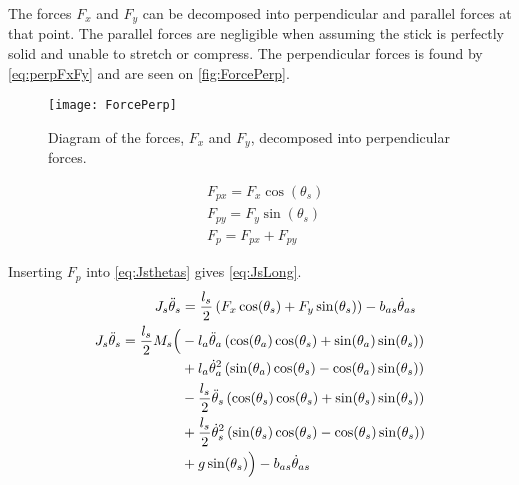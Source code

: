 The forces $F_x$ and $F_y$ can be decomposed into perpendicular and parallel forces at that point. The parallel forces are negligible when assuming the stick is perfectly solid and unable to stretch or compress. The perpendicular forces is found by \autoref{eq:perpFxFy} and are seen on \autoref{fig:ForcePerp}.

\begin{figure}[htbp]
\centering
\texttt{[image: ForcePerp]}
\caption{Diagram of the forces, $F_x$ and $F_y$, decomposed into perpendicular forces.}
\label{fig:ForcePerp}
\end{figure}

\begin{subequations}\label{eq:perpFxFy}
\begin{flalign}
& F_{px}=F_x\cos(\theta_s) \\
& F_{py}=F_y\sin(\theta_s)  \\
& F_p = F_{px}+F_{py} 
\end{flalign}
\end{subequations}

Inserting $F_p$ into \autoref{eq:Jsthetas} gives \autoref{eq:JsLong}.
\begin{subequations}
\begin{flalign}
 J_s\ddot{\theta}_s &=\frac{l_s}{2}\left(F_x\cos(\theta_s)+F_y\sin(\theta_s)\right)-b_{as}\dot{\theta}_{as}  \\
 J_s\ddot{\theta}_s = \frac{l_s}{2}M_s \Big( &-l_a\ddot{\theta}_a\left(\cos(\theta_a)\cos(\theta_s)+\sin(\theta_a)\sin(\theta_s)\right) \notag \\
& +l_a\dot{\theta}_a^2\left(\sin(\theta_a)\cos(\theta_s)-\cos(\theta_a)\sin(\theta_s)\right) \notag \\
& -\frac{l_s}{2}\ddot{\theta}_s\left(\cos(\theta_s)\cos(\theta_s)+\sin(\theta_s)\sin(\theta_s)\right) \notag \\
& +\frac{l_s}{2}\dot{\theta}_s^2\left(\sin(\theta_s)\cos(\theta_s)-\cos(\theta_s)\sin(\theta_s)\right)  \notag \\
& +g\sin(\theta_s) \Big)-b_{as}\dot{\theta}_{as} \label{eq:JsLong}
\end{flalign}
\end{subequations}

